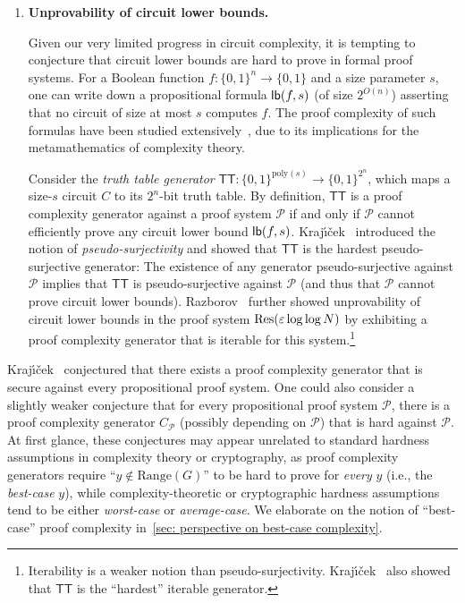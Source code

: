 \documentclass[10pt,a4paper]{article}
\theoremstyle{definition}
\theoremstyle{remark}
\renewcommand{\poly}{\mathrm{poly}}
\newcommand{\eps}{\varepsilon}
\newcommand{\calP}{\mathcal{P}}
\newcommand{\Range}{\mathrm{Range}}
\newcommand{\TT}{\mathsf{TT}}
\newcommand{\Krajicek}{Kraj\'{\i}\v{c}ek\xspace}
\begin{document}
\begin{enumerate}
    \item {\bf Unprovability of circuit lower bounds.}
    
    Given our very limited progress in circuit complexity, it is tempting to conjecture that circuit lower bounds are hard to prove in formal proof systems. For a Boolean function $f: \{0, 1\}^n \to \{0, 1\}$ and a size parameter $s$, one can write down a propositional formula ${\sf lb}(f, s)$ (of size $2^{O(n)}$) asserting that no circuit of size at most $s$ computes $f$. The proof complexity of such formulas have been studied extensively~\cite{Razborov98, Razborov04, Krajicek04, razborov2015pseudorandom, Pich15, PichS19, SanthanamT21, PichS22}, due to its implications for the metamathematics of complexity theory.

    Consider the \emph{truth table generator} $\TT: \{0,1\}^{\poly(s)} \to \{0,1\}^{2^n}$, which maps a size-$s$ circuit $C$ to its $2^n$-bit truth table. By definition, $\TT$ is a proof complexity generator against a proof system $\calP$ if and only if $\calP$ cannot efficiently prove any circuit lower bound ${\sf lb}(f, s)$. \Krajicek~\cite{Krajicek04} introduced the notion of \emph{pseudo-surjectivity} and showed that $\TT$ is the hardest pseudo-surjective generator: The existence of any generator pseudo-surjective against $\calP$ implies that $\TT$ is pseudo-surjective against $\calP$ (and thus that $\calP$ cannot prove circuit lower bounds). Razborov~\cite{razborov2015pseudorandom} further showed unprovability of circuit lower bounds in the proof system ${\rm Res}(\eps \log\log N)$ by exhibiting a proof complexity generator that is iterable for this system.\footnote{Iterability is a weaker notion than pseudo-surjectivity. \Krajicek~\cite{Krajicek04} also showed that $\TT$ is the ``hardest'' iterable generator.}
\end{enumerate}

\Krajicek~\cite{Krajicek04, Krajicek23, krajivcek2024existence} conjectured that there exists a proof complexity generator that is secure against every propositional proof system. One could also consider a slightly weaker conjecture that for every propositional proof system $\calP$, there is a proof complexity generator $C_\calP$ (possibly depending on $\calP$) that is hard against $\calP$. At first glance, these conjectures may appear unrelated to standard hardness assumptions in complexity theory or cryptography, as proof complexity generators require ``$y\not\in\Range(G)$'' to be hard to prove for \emph{every} $y$ (i.e., the \emph{best-case} $y$), while complexity-theoretic or cryptographic hardness assumptions tend to be either \emph{worst-case} or \emph{average-case}. We elaborate on the notion of ``best-case'' proof complexity in~\autoref{sec: perspective on best-case complexity}.
\end{document}
